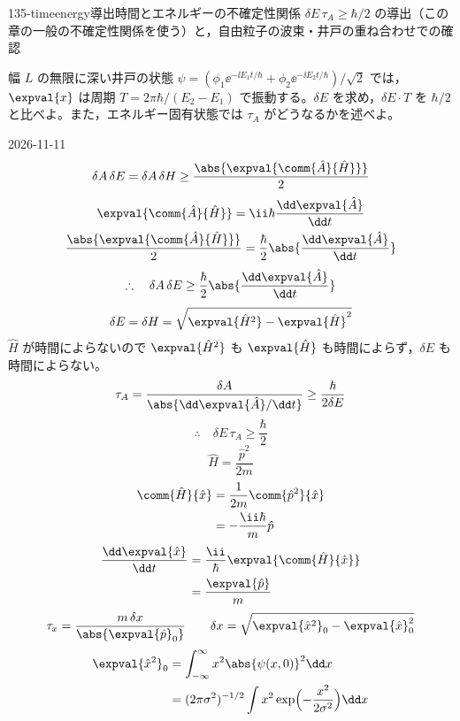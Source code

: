 \documentclass[uplatex,dvipdfmx,a4paper,11pt]{jsarticle}
\begin{document}
\begin{mondai}{135-timeenergy}{導出}{時間とエネルギーの不確定性関係 $\delta E\,\tau_{A}\ge\hbar/2$ の導出（この章の一般の不確定性関係を使う）と，自由粒子の波束・井戸の重ね合わせでの確認}
\begin{shoumon}
    \item 幅 $L$ の無限に深い井戸の状態 $\psi=(\phi_{1}\ee^{-\ii E_{1}t/\hbar}+\phi_{2}\ee^{-\ii E_{2}t/\hbar})/\sqrt{2}$ では，$\expval{x}$ は周期 $T=2\pi\hbar/(E_{2}-E_{1})$ で振動する。$\delta E$ を求め，$\delta E\cdot T$ を $\hbar/2$ と比べよ。また，エネルギー固有状態では $\tau_{A}$ がどうなるかを述べよ。
  \end{shoumon}
\begin{kotaeutsushi}{2026-11-11}
\[ \delta A\,\delta E=\delta A\,\delta H\ge\frac{\abs{\expval{\comm{\hat{A}}{\hat{H}}}}}{2} \]
\begin{gather*}
\expval{\comm{\hat{A}}{\hat{H}}}=\ii\hbar\frac{\dd\expval{\hat{A}}}{\dd t}\\
\frac{\abs{\expval{\comm{\hat{A}}{\hat{H}}}}}{2}=\frac{\hbar}{2}\abs{\frac{\dd\expval{\hat{A}}}{\dd t}}
\end{gather*}
\[ \therefore\quad\delta A\,\delta E\ge\frac{\hbar}{2}\abs{\frac{\dd\expval{\hat{A}}}{\dd t}} \]
\[ \delta E=\delta H=\sqrt{\expval{\hat{H}^{2}}-\expval{\hat{H}}^{2}} \]
$\hat{H}$ が時間によらないので $\expval{\hat{H}^{2}}$ も $\expval{\hat{H}}$ も時間によらず，$\delta E$ も時間によらない。
\[ \tau_{A}=\frac{\delta A}{\abs{\dd\expval{\hat{A}}/\dd t}}\ge\frac{\hbar}{2\delta E} \]
\[ \therefore\quad\delta E\,\tau_{A}\ge\frac{\hbar}{2} \]
\[ \hat{H}=\frac{\hat{p}^{2}}{2m} \]
\begin{align*}
\comm{\hat{H}}{\hat{x}}&=\frac{1}{2m}\comm{\hat{p}^{2}}{\hat{x}}\\
&=-\frac{\ii\hbar}{m}\hat{p}
\end{align*}
\begin{align*}
\frac{\dd\expval{\hat{x}}}{\dd t}&=\frac{\ii}{\hbar}\expval{\comm{\hat{H}}{\hat{x}}}\\
&=\frac{\expval{\hat{p}}}{m}
\end{align*}
\[ \tau_{x}=\frac{m\,\delta x}{\abs{\expval{\hat{p}}_{0}}}\qquad\delta x=\sqrt{\expval{\hat{x}^{2}}_{0}-\expval{\hat{x}}_{0}^{2}} \]
\begin{align*}
\expval{\hat{x}^{2}}_{0}&=\int_{-\infty}^{\infty}x^{2}\abs{\psi(x,0)}^{2}\dd x\\
&=(2\pi\sigma^{2})^{-1/2}\int x^{2}\exp\Bigl(-\frac{x^{2}}{2\sigma^{2}}\Bigr)\dd x\\

\end{align*}
\end{kotaeutsushi}
\end{mondai}
\end{document}
